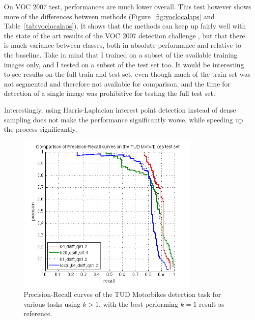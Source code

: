 On VOC 2007 test, performances are much lower overall. This test however shows more of the differences between methods (Figure~\ref{fig:voclocalaps} and Table~\ref{tab:voclocalaps}). It shows that the methods can keep up fairly well with the state of the art results of the VOC 2007 detection challenge \cite{pascal-voc-2007}, but that there is much variance between classes, both in absolute performance and relative to the baseline. Take in mind that I trained on a subset of the available training images only, and I tested on a subset of the test set too. It would be interesting to see results on the full train and test set, even though much of the train set was not segmented and therefore not available for comparison, and the time for detection of a single image was prohibitive for testing the full test set.

Interestingly, using Harris-Laplacian interest point detection instead of dense sampling does not make the performance significantly worse, while speeding up the process significantly.

\begin{figure}[hbt]
    \centering
    \includegraphics[width=0.8\textwidth]{TUD_local}
    \caption{Precision-Recall curves of the TUD Motorbikes detection task for various tasks using $k>1$, with the best performing $k=1$ result as reference.}
    \label{fig:tudlocalprecrec}
\end{figure}


